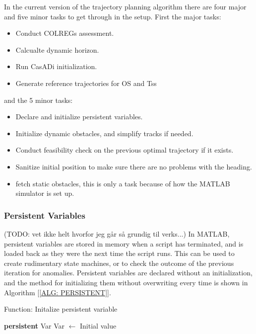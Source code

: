 In the current version of the trajectory planning algorithm there are four major and five minor tasks to get through
in the setup. First the major tasks:
\begin{itemize}
    \item Conduct COLREGs assessment.
    \item Calcualte dynamic horizon.
    \item Run CasADi initialization.
    \item Generate reference trajectories for \gls{OS} and \gls{Ts}s
\end{itemize}
and the 5 minor tasks:
\begin{itemize}
    \item Declare and initialize persistent variables.
    \item Initialize dynamic obstacles, and simplify tracks if needed.
    \item Conduct feasibility check on the previous optimal trajectory if it exists.
    \item Sanitize initial position to make sure there are no problems with the heading.
    \item fetch static obstacles, this is only a task because of how the MATLAB simulator is set up.
\end{itemize}

\subsubsection*{Persistent Variables} (TODO: vet ikke helt hvorfor jeg går så grundig til verks...)
In MATLAB, persistent variables are stored in memory when a script has terminated, and is loaded back as they were the next
time the script runs. This can be used to create rudimentary state machines, or to check the outcome of the previous iteration for anomalies.
Persistent variables are declared without an initialization, and the method for initializing them without overwriting every time is shown in Algorithm [\ref{ALG: PERSISTENT}].

\begin{algorithm}[h]
    \caption{Function: Initalize persistent variable} \label{ALG: PERSISTENT}
    \begin{algorithmic}
        \State \textbf{persistent} Var
            \State Var $\gets$ Initial value
        \EndIf
    \end{algorithmic}
\end{algorithm}

